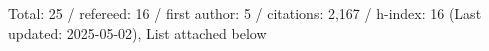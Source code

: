 Total: 25 / refereed: 16 / first author: 5 / citations: 2,167 / h-index: 16 (Last updated: 2025-05-02), List attached below